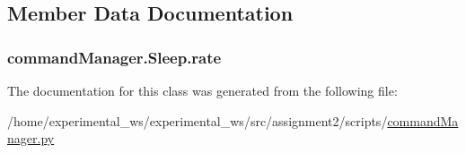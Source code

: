 \subsection{Member Data Documentation}
\subsubsection[{\texorpdfstring{rate}{rate}}]{\setlength{\rightskip}{0pt plus 5cm}command\+Manager.\+Sleep.\+rate}\hypertarget{classcommandManager_1_1Sleep_ad1bca2bd2c57109d92089b82fafe23c1}{}\label{classcommandManager_1_1Sleep_ad1bca2bd2c57109d92089b82fafe23c1}


The documentation for this class was generated from the following file\+:\begin{DoxyCompactItemize}
\item 
/home/experimental\+\_\+ws/experimental\+\_\+ws/src/assignment2/scripts/\hyperlink{commandManager_8py}{command\+Manager.\+py}\end{DoxyCompactItemize}
